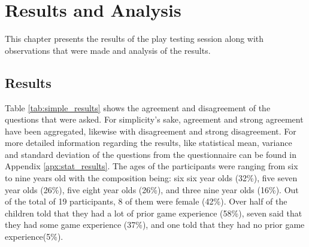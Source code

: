 \chapter{Results and Analysis}
\label{chp:analysis}
This chapter presents the results of the play testing session along with observations that were made and analysis of the results.


\section{Results}
Table \ref{tab:simple_results} shows the agreement and disagreement of the questions that were asked. For simplicity's sake, agreement and strong agreement have been aggregated, likewise with disagreement and strong disagreement.
For more detailed information regarding the results, like statistical mean, variance and standard deviation of the questions from the questionnaire can be found in Appendix \ref{apx:stat_results}. The ages of the participants were ranging from six to nine years old with the composition being: six six year olds (32\%), five seven year olds (26\%), five eight year olds (26\%), and three nine year olds (16\%). Out of the total of 19 participants, 8 of them were female (42\%). Over half of the children told that they had a lot of prior game experience (58\%), seven said that they had some game experience (37\%), and one told that they had no prior game experience(5\%).


